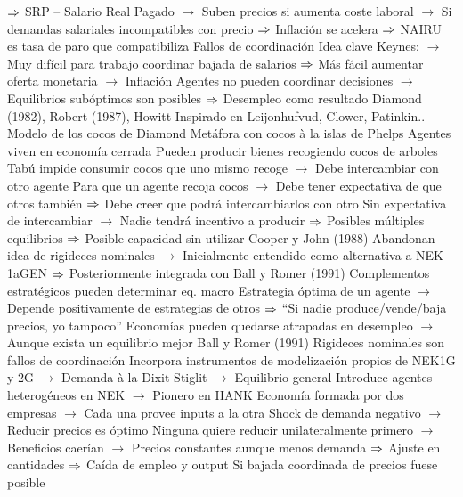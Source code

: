 \documentclass{nuevotema}
\begin{document}
\begin{esquemal}
				\4[] $\Rightarrow$ SRP -- Salario Real Pagado
				\4[] $\to$ Suben precios si aumenta coste laboral
				\4[] $\to$ Si demandas salariales incompatibles con precio
				\4[] $\Rightarrow$ Inflación se acelera
				\4[] $\Rightarrow$ NAIRU es tasa de paro que compatibiliza
			\3 Fallos de coordinación
				\4 Idea clave
				\4[] Keynes:
				\4[] $\to$ Muy difícil para trabajo coordinar bajada de salarios
				\4[] $\Rightarrow$ Más fácil aumentar oferta monetaria $\to$ Inflación
				\4[] Agentes no pueden coordinar decisiones
				\4[] $\to$ Equilibrios subóptimos son posibles
				\4[] $\Rightarrow$ Desempleo como resultado
				\4 Diamond (1982), Robert (1987), Howitt
				\4[] Inspirado en Leijonhufvud, Clower, Patinkin..
				\4 Modelo de los cocos de Diamond
				\4[] Metáfora con cocos à la islas de Phelps
				\4[] Agentes viven en economía cerrada
				\4[] Pueden producir bienes recogiendo cocos de arboles
				\4[] Tabú impide consumir cocos que uno mismo recoge
				\4[] $\to$ Debe intercambiar con otro agente
				\4[] Para que un agente recoja cocos
				\4[] $\to$ Debe tener expectativa de que otros también
				\4[] $\Rightarrow$ Debe creer que podrá intercambiarlos con otro
				\4[] Sin expectativa de intercambiar
				\4[] $\to$ Nadie tendrá incentivo a producir
				\4[] $\Rightarrow$ Posibles múltiples equilibrios
				\4[] $\Rightarrow$ Posible capacidad sin utilizar
				\4 Cooper y John (1988)
				\4[] Abandonan idea de rigideces nominales
				\4[] $\to$ Inicialmente entendido como alternativa a NEK 1aGEN
				\4[] $\Rightarrow$ Posteriormente integrada con Ball y Romer (1991)
				\4[] Complementos estratégicos pueden determinar eq. macro
				\4[] Estrategia óptima de un agente
				\4[] $\to$ Depende positivamente de estrategias de otros
				\4[] $\Rightarrow$ ``Si nadie produce/vende/baja precios, yo tampoco''
				\4[] Economías pueden quedarse atrapadas en desempleo
				\4[] $\to$ Aunque exista un equilibrio mejor
				\4 Ball y Romer (1991)
				\4[] Rigideces nominales son fallos de coordinación
				\4[] Incorpora instrumentos de modelización propios de NEK1G y 2G
				\4[] $\to$ Demanda à la Dixit-Stiglit
				\4[] $\to$ Equilibrio general
				\4[] Introduce agentes heterogéneos en NEK
				\4[] $\to$ Pionero en HANK
				\4[] Economía formada por dos empresas
				\4[] $\to$ Cada una provee inputs a la otra
				\4[] Shock de demanda negativo
				\4[] $\to$ Reducir precios es óptimo
				\4[] Ninguna quiere reducir unilateralmente primero
				\4[] $\to$ Beneficios caerían
				\4[] $\to$ Precios constantes aunque menos demanda
				\4[] $\Rightarrow$ Ajuste en cantidades
				\4[] $\Rightarrow$ Caída de empleo y output
				\4[] Si bajada coordinada de precios fuese posible

\end{esquemal}
\end{document}
